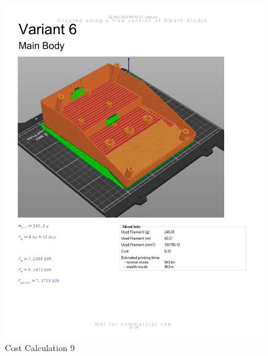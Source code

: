 \begin{figure}[H]
    \centering
    \includegraphics[width=\linewidth]{texs/appendix/data/costcalculation/cost1-09.jpg}
    \caption{Cost Calculation 9}
    \label{fig:cost-calculation-9}
\end{figure}

